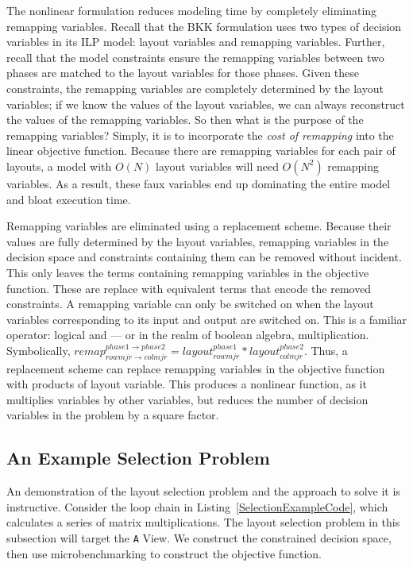 The nonlinear formulation reduces modeling time by completely eliminating remapping variables.
Recall that the BKK formulation uses two types of decision variables in its ILP model: layout variables and remapping variables.
Further, recall that the model constraints ensure the remapping variables between two phases are matched to the layout variables for those phases.
Given these constraints, the remapping variables are completely determined by the layout variables; 
if we know the values of the layout variables, we can always reconstruct the values of the remapping variables.
So then what is the purpose of the remapping variables? 
Simply, it is to incorporate the \textit{cost of remapping} into the linear objective function.
Because there are remapping variables for each pair of layouts, a model with $O(N)$ layout variables will need $O(N^2)$ remapping variables.
As a result, these faux variables end up dominating the entire model and bloat execution time.

Remapping variables are eliminated using a replacement scheme. 
Because their values are fully determined by the layout variables, remapping variables in the decision space and constraints containing them can be removed without incident.
This only leaves the terms containing remapping variables in the objective function.
These are replace with equivalent terms that encode the removed constraints.
A remapping variable can only be switched on when the layout variables corresponding to its input and output are switched on.
This is a familiar operator: logical and --- or in the realm of boolean algebra, multiplication.
Symbolically, $remap_{rowmjr \rightarrow colmjr}^{phase1 \rightarrow phase2} = layout_{rowmjr}^{phase1} * layout_{colmjr}^{phase2}$.
Thus, a replacement scheme can replace remapping variables in the objective function with products of layout variable.
This produces a nonlinear function, as it multiplies variables by other variables, but reduces the number of decision variables in the problem by a square factor.


\subsection{An Example Selection Problem}

An demonstration of the layout selection problem and the approach to solve it is instructive.
Consider the loop chain in Listing~\ref{SelectionExampleCode}, which calculates a series of matrix multiplications.
The layout selection problem in this subsection will target the \verb.A. View.
We construct the constrained decision space, then use microbenchmarking to construct the objective function.

